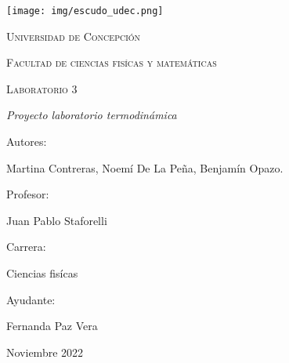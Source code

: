 \documentclass[]{article}
\begin{document}
\begin{titlepage}
      \begin{center}     
              
            \texttt{[image: img/escudo\_udec.png]}                       %
            
            
            
            \vspace{1cm}
            \textsc{{\LARGE Universidad de Concepción}}
            
            \vspace{1cm}
            {\scshape\Large Facultad de ciencias fisícas y matemáticas \par}
            \vspace{2cm}
            {\scshape\Huge Laboratorio 3 \par}
            \vspace{2cm}
            {\itshape\Large Proyecto laboratorio termodinámica \par}
            \vfill
            {\Large Autores: \par}
            {\Large Martina Contreras, Noemí De La Peña, Benjamín Opazo. \par}
            \vfill
            \vfill
            {\Large Profesor: \par}
            {\Large Juan Pablo Staforelli \par}
            \vfill
            \vfill
            {\Large Carrera: \par}
            {\Large Ciencias fisícas \par}
            \vfill
            \vfill
            {\Large Ayudante: \par}
            {\Large Fernanda Paz Vera \par}
            \vfill
            {\Large Noviembre 2022 \par}
      \end{center}
\end{titlepage}            
 

\tableofcontents
\newpage






\begin{abstract}
  En este laboratorio se llevaron a cabo 4 experimentos relacionados con los circuitos eléctricos, donde se hizo variar el voltaje de entrada para estudiar la variación de la intensidad de corriente en cada circuito.
Los circuitos utilizados fueron: Conductor metálico, Filamento de ampolleta de linterna, Diodo semiconductor común y Diodo emisor de luz (DEL o LED).
Donde se concluye que cada material posee distintas propiedades, las cuales son: Potencia disipada, Conductividad o Resistividad y libre flujo de corriente.
\end{abstract}
\end{document}
